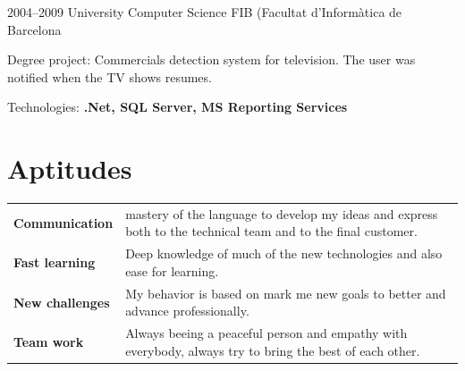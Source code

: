 \documentclass[]{friggeri-cv} %
\begin{document}
\begin{entrylist}
\entry
{2004--2009}
{University {\normalfont Computer Science}}
{FIB (Facultat d'Informàtica de Barcelona}
{Degree project: Commercials detection system for television. The user was
  notified when the TV shows resumes.


  Technologies: \textbf{.Net, SQL Server, MS Reporting Services}
}
\end{entrylist}


\section{Aptitudes}


\begin{tabular}{p{3cm}p{10.8cm}}
\textbf{Communication} & mastery of the language to develop my ideas and express both to the technical team and to the final customer.
\vspace{\parsep}
\\
\textbf{Fast learning} & Deep knowledge of much of the new technologies and also
ease for learning.
\vspace{\parsep}
\\
\textbf{New challenges} & My behavior is based on mark me new goals to better and advance professionally.
\vspace{\parsep}
\\
\textbf{Team work} & Always beeing a peaceful person and empathy with everybody,
always try to bring the best of each other.
\vspace{\parsep}
\\
\end{tabular}


\end{document}
